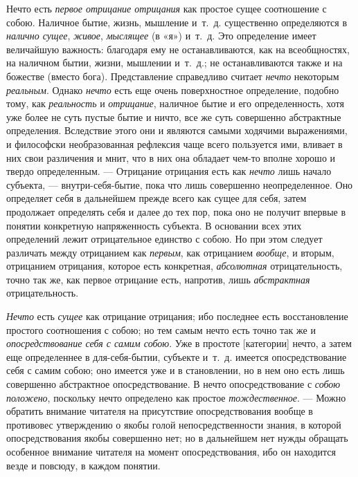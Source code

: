 Нечто есть {\em первое отрицание отрицания} как простое
сущее соотношение с собою. Наличное бытие, жизнь, мышление и~т.~д.
существенно определяются в {\em налично сущее},
{\em живое}, {\em мыслящее} (в «я»)
и~т.~д. Это определение имеет величайшую важность: благодаря ему не
останавливаются, как на всеобщностях, на наличном бытии, жизни, мышлении
и~т.~д.; не останавливаются также и на божестве (вместо бога).
Представление справедливо считает {\em нечто} некоторым
{\em реальным}. Однако {\em нечто}
есть еще очень поверхностное определение, подобно тому, как
{\em реальность} и {\em отрицание},
наличное бытие и его определенность, хотя уже более не суть пустые бытие и
ничто, все же суть совершенно абстрактные определения. Вследствие этого они
и являются самыми ходячими выражениями, и философски необразованная
рефлексия чаще всего пользуется ими, вливает в них свои различения и мнит,
что в них она обладает чем-то вполне хорошо и твердо определенным. —
Отрицание отрицания есть как {\em нечто} лишь начало
субъекта, — внутри-себя-бытие, пока что лишь совершенно неопределенное. Оно
определяет себя в дальнейшем прежде всего как сущее для себя, затем
продолжает определять себя и далее до тех пор, пока оно не получит впервые
в понятии конкретную напряженность субъекта. В основании всех этих
определений лежит отрицательное единство с собою. Но при этом следует
различать между отрицанием как {\em первым}, как
отрицанием {\em вообще}, и вторым, отрицанием
отрицания, которое есть конкретная, {\em абсолютная}
отрицательность, точно так же, как первое отрицание есть, напротив, лишь
{\em абстрактная} отрицательность.

{\em Нечто} есть {\em сущее} как
отрицание отрицания; ибо последнее есть восстановление простого соотношения
с собою; но тем самым нечто есть точно так же и
{\em опосредствование себя с самим собою}. Уже в
простоте [категории] нечто, а затем еще определеннее в для-себя-бытии,
субъекте и~т.~д. имеется опосредствование себя с самим собою; оно имеется
уже и в становлении, но в нем оно есть лишь совершенно абстрактное
опосредствование. В нечто опосредствование с {\em собою
положено}, поскольку нечто определено как простое
{\em тождественное}. — Можно обратить внимание читателя
на присутствие опосредствования вообще в противовес утверждению о якобы
голой непосредственности знания, в которой опосредствования якобы
совершенно нет; но в дальнейшем нет нужды обращать особенное внимание
читателя на момент опосредствования, ибо он находится везде и повсюду, в
каждом понятии.

